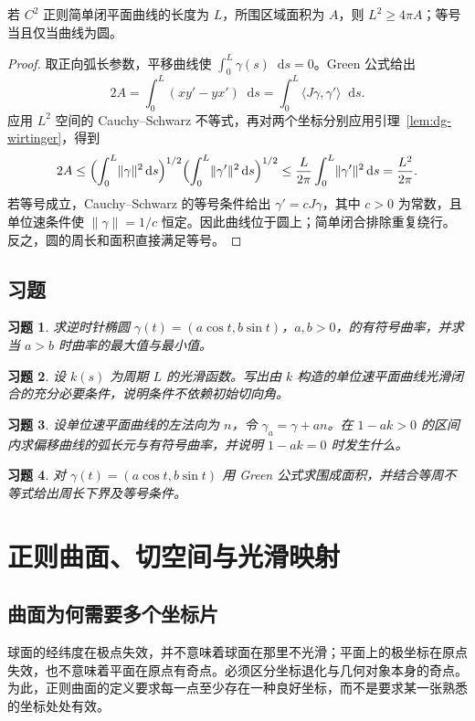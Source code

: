 \documentclass[UTF8,12pt,a4paper,fontset=fandol]{ctexbook}
\newcommand{\dd}{\mathop{}\!\mathrm d}
\newcommand{\ip}[2]{\langle #1,#2\rangle}
\newcommand{\norm}[1]{\lVert #1\rVert}
\newtheorem{exercise}{习题}[chapter]
\begin{document}
\begin{theorem}[平面等周不等式]
若 $C^2$ 正则简单闭平面曲线的长度为 $L$，所围区域面积为 $A$，则 $L^2\ge4\pi A$；等号当且仅当曲线为圆。
\end{theorem}
\begin{proof}
取正向弧长参数，平移曲线使 $\int_0^L\gamma(s)\dd s=0$。Green 公式给出
\[
 2A=\int_0^L(xy'-yx')\dd s
 =\int_0^L\ip{J\gamma}{\gamma'}\dd s.
\]
应用 $L^2$ 空间的 Cauchy--Schwarz 不等式，再对两个坐标分别应用引理~\ref{lem:dg-wirtinger}，得到
\[
 2A\le\Bigl(\int_0^L\norm\gamma^2\dd s\Bigr)^{1/2}
          \Bigl(\int_0^L\norm{\gamma'}^2\dd s\Bigr)^{1/2}
 \le\frac L{2\pi}\int_0^L\norm{\gamma'}^2\dd s
 =\frac{L^2}{2\pi}.
\]
若等号成立，Cauchy--Schwarz 的等号条件给出 $\gamma'=cJ\gamma$，其中 $c>0$ 为常数，且单位速条件使 $\norm\gamma=1/c$ 恒定。因此曲线位于圆上；简单闭合排除重复绕行。反之，圆的周长和面积直接满足等号。
\end{proof}

\section{习题}
\begin{exercise}\label{ex:dg-plane-ellipse}
求逆时针椭圆 $\gamma(t)=(a\cos t,b\sin t)$，$a,b>0$，的有符号曲率，并求当 $a>b$ 时曲率的最大值与最小值。
\end{exercise}
\begin{exercise}\label{ex:dg-plane-closed}
设 $k(s)$ 为周期 $L$ 的光滑函数。写出由 $k$ 构造的单位速平面曲线光滑闭合的充分必要条件，说明条件不依赖初始切向角。
\end{exercise}
\begin{exercise}\label{ex:dg-plane-offset}
设单位速平面曲线的左法向为 $n$，令 $\gamma_a=\gamma+an$。在 $1-ak>0$ 的区间内求偏移曲线的弧长元与有符号曲率，并说明 $1-ak=0$ 时发生什么。
\end{exercise}
\begin{exercise}\label{ex:dg-plane-area}
对 $\gamma(t)=(a\cos t,b\sin t)$ 用 Green 公式求围成面积，并结合等周不等式给出周长下界及等号条件。
\end{exercise}

\chapter{正则曲面、切空间与光滑映射}
\label{chap:dg-surfaces}

\section{曲面为何需要多个坐标片}
球面的经纬度在极点失效，并不意味着球面在那里不光滑；平面上的极坐标在原点失效，也不意味着平面在原点有奇点。必须区分坐标退化与几何对象本身的奇点。为此，正则曲面的定义要求每一点至少存在一种良好坐标，而不是要求某一张熟悉的坐标处处有效。
\end{document}
